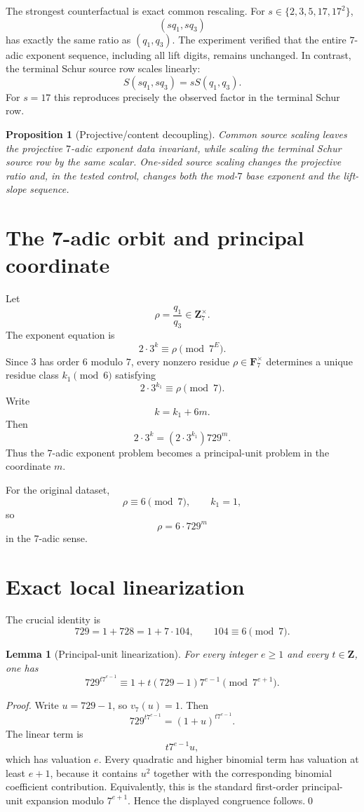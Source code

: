 \documentclass[11pt]{article}
\newtheorem{proposition}[theorem]{Proposition}
\newtheorem{lemma}[theorem]{Lemma}
\theoremstyle{definition}
\theoremstyle{remark}
\begin{document}
The strongest counterfactual is exact common rescaling. For $s\in\{2,3,5,17,17^2\}$,
\[
(sq_1,sq_3)
\]
has exactly the same ratio as $(q_1,q_3)$. The experiment verified that the entire $7$-adic exponent sequence, including all lift digits, remains unchanged. In contrast, the terminal Schur source row scales linearly:
\[
S(sq_1,sq_3)=sS(q_1,q_3).
\]
For $s=17$ this reproduces precisely the observed factor in the terminal Schur row.

\begin{proposition}[Projective/content decoupling]
Common source scaling leaves the projective $7$-adic exponent data invariant, while scaling the terminal Schur source row by the same scalar. One-sided source scaling changes the projective ratio and, in the tested control, changes both the mod-$7$ base exponent and the lift-slope sequence.
\end{proposition}

\section{The 7-adic orbit and principal coordinate}
Let
\[
\rho=\frac{q_1}{q_3}\in\mathbf Z_7^\times.
\]
The exponent equation is
\[
2\cdot3^k\equiv\rho\pmod{7^E}.
\]
Since $3$ has order $6$ modulo $7$, every nonzero residue $\rho\in\mathbf F_7^\times$ determines a unique residue class $k_1\pmod6$ satisfying
\[
2\cdot3^{k_1}\equiv\rho\pmod7.
\]
Write
\[
k=k_1+6m.
\]
Then
\[
2\cdot3^k
=
(2\cdot3^{k_1})729^m.
\]
Thus the $7$-adic exponent problem becomes a principal-unit problem in the coordinate $m$.

For the original dataset,
\[
\rho\equiv6\pmod7,
\qquad
k_1=1,
\]
so
\[
\rho=6\cdot729^m
\]
in the $7$-adic sense.

\section{Exact local linearization}
The crucial identity is
\[
729=1+728=1+7\cdot104,
\qquad
104\equiv6\pmod7.
\]

\begin{lemma}[Principal-unit linearization]
For every integer $e\ge1$ and every $t\in\mathbf Z$, one has
\[
729^{t7^{e-1}}
\equiv
1+t(729-1)7^{e-1}
\pmod{7^{e+1}}.
\]
\end{lemma}

\begin{proof}
Write $u=729-1$, so $v_7(u)=1$. Then
\[
729^{t7^{e-1}}=(1+u)^{t7^{e-1}}.
\]
The linear term is
\[
t7^{e-1}u,
\]
which has valuation $e$. Every quadratic and higher binomial term has valuation at least $e+1$, because it contains $u^2$ together with the corresponding binomial coefficient contribution. Equivalently, this is the standard first-order principal-unit expansion modulo $7^{e+1}$. Hence the displayed congruence follows.\qed
\end{proof}
\end{document}
